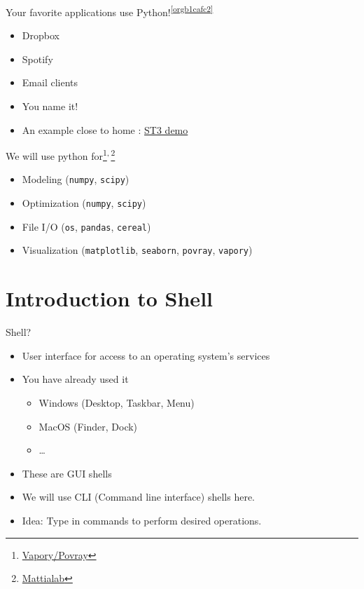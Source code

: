 \documentclass[presentation]{beamer}
\begin{document}
\begin{frame}[label={sec:org34aab27}]{Your favorite applications use Python!\textsuperscript{\ref{orgb1cafc2}}}
\begin{itemize}
\item Dropbox
\item Spotify
\item Email clients
\item You name it!
\item An example close to home : \href{code/clangformat.cpp}{ST3 demo}
\end{itemize}
\end{frame}

\begin{frame}[label={sec:org8b78f35},fragile]{We will use python for\footnote{\href{https://zulko.github.io/blog/2014/11/13/things-you-can-do-with-python-and-pov-ray/\#disqus\_thread}{Vapory/Povray}}\textsuperscript{,}\,\footnote{\href{http://mattia-lab.com/work/soft-filaments/}{Mattialab}}}
 \begin{itemize}
\item Modeling (\texttt{numpy}, \texttt{scipy})
\item Optimization (\texttt{numpy}, \texttt{scipy})
\item File I/O (\texttt{os}, \texttt{pandas}, \texttt{cereal})
\item Visualization (\texttt{matplotlib}, \texttt{seaborn}, \texttt{povray}, \texttt{vapory})
\end{itemize}
\end{frame}

\section{Introduction to Shell}
\label{sec:orge058c40}
\begin{frame}[label={sec:org6b6dc8f}]{Shell?}
\begin{itemize}
\item User interface for access to an operating system's services
\item You have already used it
\begin{itemize}
\item Windows (Desktop, Taskbar, Menu)
\item MacOS (Finder, Dock)
\item \ldots{}
\end{itemize}
\item These are GUI shells
\item We will use CLI (Command line interface) shells here.
\item Idea: Type in commands to perform desired operations.
\end{itemize}
\end{frame}
\end{document}
